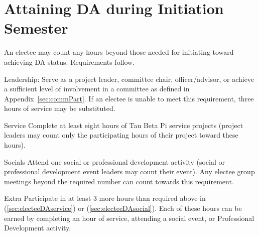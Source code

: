 \section{Attaining DA during Initiation Semester}
An electee may count any hours beyond those needed for initiating toward achieving DA status.
Requirements follow.
\begin{enumsubsection}
\item{Leadership:}
Serve as a project leader, committee chair, officer/advisor, or achieve a sufficient level of involvement in a committee as defined in Appendix~\ref{sec:commPart}.
If an electee is unable to meet this requirement, three hours of service may be substituted.
\item{Service}\label{sec:electeeDAservice}
Complete at least eight hours of Tau Beta Pi service projects (project leaders may count only the participating hours of their project toward these hours).
\item{Socials}
\label{sec:electeeDAsocial} Attend one social or professional development activity (social or professional development event leaders may count their event).
Any electee group meetings beyond the required number can count towards this requirement.
\item{Extra}
Participate in at least 3 more hours than required above in (\ref{sec:electeeDAservice}) or (\ref{sec:electeeDAsocial}).
Each of these hours can be earned by completing an hour of service, attending a social event, or Professional Development activity.

\end{enumsubsection}
